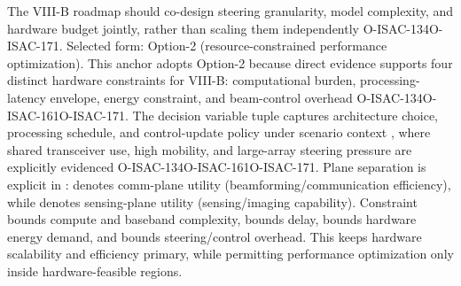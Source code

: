  The VIII-B roadmap should co-design steering granularity, model complexity, and hardware budget jointly, rather than scaling them independently O-ISAC-134O-ISAC-171.\markdownRendererOlItemEnd 
\markdownRendererOlEnd \markdownRendererInterblockSeparator
{}
\markdownRendererSectionEnd \markdownRendererSectionBegin
{}\markdownRendererInterblockSeparator
{}Selected form: Option-2 (resource-constrained performance optimization).\markdownRendererParagraphSeparator
{}\markdownRendererParagraphSeparator
{}This anchor adopts Option-2 because direct evidence supports four distinct hardware constraints for VIII-B: computational burden, processing-latency envelope, energy constraint, and beam-control overhead O-ISAC-134O-ISAC-161O-ISAC-171. The decision variable tuple  captures architecture choice, processing schedule, and control-update policy under scenario context , where shared transceiver use, high mobility, and large-array steering pressure are explicitly evidenced O-ISAC-134O-ISAC-161O-ISAC-171. Plane separation is explicit in :  denotes comm-plane utility (beamforming/communication efficiency), while  denotes sensing-plane utility (sensing/imaging capability). Constraint  bounds compute and baseband complexity,  bounds delay,  bounds hardware energy demand, and  bounds steering/control overhead. This keeps hardware scalability and efficiency primary, while permitting performance optimization only inside hardware-feasible regions.\markdownRendererInterblockSeparator
{}
\markdownRendererSectionEnd \markdownRendererSectionBegin
